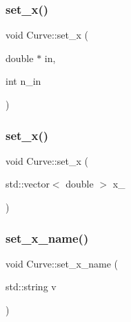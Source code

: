\mbox{\label{class_curve_a5a43592686a79c9d4e794eec1cb693ac}} 
\subsubsection{\texorpdfstring{set\+\_\+x()}{set\_x()}\hspace{0.1cm}{\footnotesize\ttfamily [1/2]}}
{\footnotesize\ttfamily void Curve\+::set\+\_\+x (\begin{DoxyParamCaption}\item[{double $\ast$}]{in,  }\item[{int}]{n\+\_\+in }\end{DoxyParamCaption})}

\mbox{\label{class_curve_a94659672cb6627ce6a226c9e77652e84}} 
\subsubsection{\texorpdfstring{set\+\_\+x()}{set\_x()}\hspace{0.1cm}{\footnotesize\ttfamily [2/2]}}
{\footnotesize\ttfamily void Curve\+::set\+\_\+x (\begin{DoxyParamCaption}\item[{std\+::vector$<$ double $>$}]{x\+\_\+ }\end{DoxyParamCaption})}

\mbox{\label{class_curve_a8170b7da97887fa363250bf34bb53859}} 
\subsubsection{\texorpdfstring{set\+\_\+x\+\_\+name()}{set\_x\_name()}}
{\footnotesize\ttfamily void Curve\+::set\+\_\+x\+\_\+name (\begin{DoxyParamCaption}\item[{std\+::string}]{v }\end{DoxyParamCaption})}

\mbox{\label{class_curve_a16534fa18b0982751ebf2c19eb092949}} 

